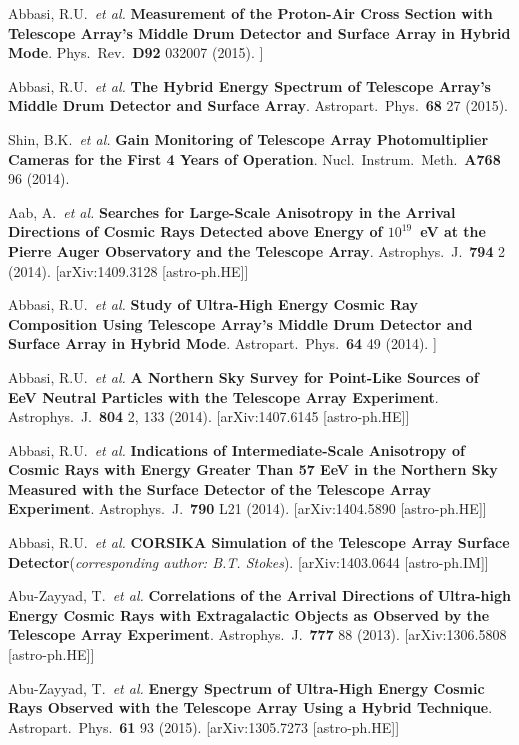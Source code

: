 \begin{resume}
Abbasi, R.U.\ {\it et al.} {\bf Measurement of the Proton-Air Cross Section with Telescope Array’s Middle Drum Detector and Surface Array in Hybrid Mode}. Phys.\ Rev.\ {\bf D92} 032007 (2015). \newline
[arXiv:1505.01860 [astro-ph.HE]]

Abbasi, R.U.\ {\it et al.} {\bf The Hybrid Energy Spectrum of Telescope Array’s Middle Drum Detector and Surface Array}. Astropart.\ Phys.\ {\bf 68} 27 (2015).

Shin, B.K.\ {\it et al.} {\bf Gain Monitoring of Telescope Array Photomultiplier Cameras for the First 4 Years of Operation}. Nucl.\ Instrum.\ Meth.\ {\bf A768} 96 (2014).

Aab, A.\ {\it et al.} {\bf Searches for Large-Scale Anisotropy in the Arrival Directions of Cosmic Rays Detected above Energy of \boldmath$10^{19}$~eV at the Pierre Auger Observatory and the Telescope Array}. Astrophys.\ J.\ {\bf 794} 2 (2014). [arXiv:1409.3128 [astro-ph.HE]]

Abbasi, R.U.\ {\it et al.} {\bf Study of Ultra-High Energy Cosmic Ray Composition Using Telescope Array's Middle Drum Detector and Surface Array in Hybrid Mode}. Astropart.\ Phys.\ {\bf 64} 49 (2014). \newline
[arXiv:1408.1726 [astro-ph.HE]]

Abbasi, R.U.\ {\it et al.} {\bf A Northern Sky Survey for Point-Like Sources of EeV Neutral Particles with the Telescope Array Experiment}. Astrophys.\ J.\ {\bf 804} 2, 133 (2014). [arXiv:1407.6145 [astro-ph.HE]]

Abbasi, R.U.\ {\it et al.} {\bf Indications of Intermediate-Scale Anisotropy of Cosmic Rays with Energy Greater Than 57 EeV in the Northern Sky Measured with the Surface Detector of the Telescope Array Experiment}. Astrophys.\ J.\ {\bf 790} L21 (2014). [arXiv:1404.5890 [astro-ph.HE]]

Abbasi, R.U.\ {\it et al.} {\bf CORSIKA Simulation of the Telescope Array Surface Detector}({\it corresponding author: B.T. Stokes}). [arXiv:1403.0644 [astro-ph.IM]]

Abu-Zayyad, T.\ {\it et al.} {\bf Correlations of the Arrival Directions of Ultra-high Energy Cosmic Rays with Extragalactic Objects as Observed by the Telescope Array Experiment}. Astrophys.\ J.\ {\bf 777} 88 (2013). [arXiv:1306.5808 [astro-ph.HE]]

Abu-Zayyad, T.\ {\it et al.} {\bf Energy Spectrum of Ultra-High Energy Cosmic Rays Observed with the Telescope Array Using a Hybrid Technique}. Astropart.\ Phys.\ {\bf 61} 93 (2015).  [arXiv:1305.7273 [astro-ph.HE]]


\end{resume}
